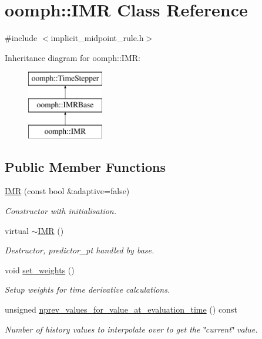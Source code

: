 \hypertarget{classoomph_1_1IMR}{}\section{oomph\+:\+:I\+MR Class Reference}
\label{classoomph_1_1IMR}


{\ttfamily \#include $<$implicit\+\_\+midpoint\+\_\+rule.\+h$>$}

Inheritance diagram for oomph\+:\+:I\+MR\+:\begin{figure}[H]
\begin{center}
\leavevmode
\includegraphics[height=3.000000cm]{classoomph_1_1IMR}
\end{center}
\end{figure}
\subsection*{Public Member Functions}
\begin{DoxyCompactItemize}
\item 
\hyperlink{classoomph_1_1IMR_aa28c3f9d2eea177280f0868e16127285}{I\+MR} (const bool \&adaptive=false)
\begin{DoxyCompactList}\small\item\em Constructor with initialisation. \end{DoxyCompactList}\item 
virtual \hyperlink{classoomph_1_1IMR_a5686334353658c65a1d5e17500f3dc34}{$\sim$\+I\+MR} ()
\begin{DoxyCompactList}\small\item\em Destructor, predictor\+\_\+pt handled by base. \end{DoxyCompactList}\item 
void \hyperlink{classoomph_1_1IMR_aecea8cd9ec75a6e3efde89e451d714c4}{set\+\_\+weights} ()
\begin{DoxyCompactList}\small\item\em Setup weights for time derivative calculations. \end{DoxyCompactList}\item 
unsigned \hyperlink{classoomph_1_1IMR_a7cfe8ba542880aa524bcb837c1bc86e4}{nprev\+\_\+values\+\_\+for\+\_\+value\+\_\+at\+\_\+evaluation\+\_\+time} () const
\begin{DoxyCompactList}\small\item\em Number of history values to interpolate over to get the \char`\"{}current\char`\"{} value. \end{DoxyCompactList}\end{DoxyCompactItemize}
